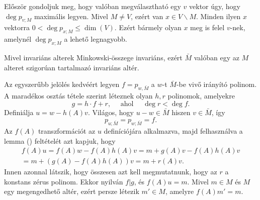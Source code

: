 \documentclass[a4paper, showtrims]{memoir}
\makeatletter
\renewenvironment{proof}[1][\proofname]
    {\par\pushQED{\qed}%
    \normalfont \topsep6\p@\@plus6\p@\relax
    \trivlist
    \item[\hskip\labelsep
        \itshape
    #1\@addpunct{:}]\ignorespaces}
    {\popQED\endtrivlist\@endpefalse}
\theoremstyle{plain}
\theoremstyle{remark}
\theoremstyle{definition}
\makeatother
\begin{document}
\begin{proof}
    Először gondoljuk meg, hogy valóban megválasztható egy $v$ vektor úgy, hogy $\deg p_{v;M}$ maximális legyen.
    Mivel $M\neq V$, ezért van $x\in V\smallsetminus M$.
    Minden ilyen $x$ vektorra 
    \begin{math}
        0<\deg p_{x;M}\leq \dim \left( V \right).
    \end{math}
    Ezért bármely olyan $x$ meg is felel $v$-nek, amelynél $\deg p_{x;M}$ a lehető legnagyobb.

    Mivel invariáns alterek Minkowski-összege invariáns, ezért $\bar{M}$ valóban egy az $M$ alteret szigorúan tartalmazó invariáns altér.

    Az egyszerűbb jelölés kedvéért legyen $f=p_{w,\bar{M}}$ a $w$-t $\bar{M}$-be vivő irányító polinom.
    A maradékos osztás tétele szerint léteznek olyan $h,r$ polinomok, amelyekre
    \[
        g=h\cdot f  + r, 
        \quad\text{ ahol }\quad
        \deg r<\deg f.
    \]
    Definiálja $u=w-h\left( A \right)v.$
    Világos, hogy $u-w\in \bar{M}$ hiszen $v\in\bar{M}$, így 
    \[
        p_{u;\bar{M}}=p_{w;\bar{M}}=f.
    \]
    Az $f\left( A \right)$ transzformációt az $u$ definíciójára alkalmazva, 
    majd felhasználva a lemma (\dag) feltételét azt kapjuk, hogy
    \begin{multline*}
        f\left( A \right)u
        =
        f\left( A \right)w
        -f\left( A \right)h\left( A \right)v
        =
        m+g\left( A \right)v
        -f\left( A \right)h\left( A \right)v
        \\
        =
        m+
        \left( g\left( A \right)-f\left( A \right)h\left( A \right) \right)v
        =
        m+
        r\left( A \right)v.
        \tag{\ddag}
    \end{multline*}
        Innen azonnal látszik, hogy összesen azt kell megmutatnunk, hogy az $r$ a konstans zérus polinom.
    Ekkor nyilván $f|g$, és $f\left( A \right)u=m$. 
    Mivel $m\in M$ és $M$ egy megengedhető altér, ezért persze létezik $m'\in M$, 
    amelyre $f\left( A \right)m'=m.$


\end{proof}
\end{document}
